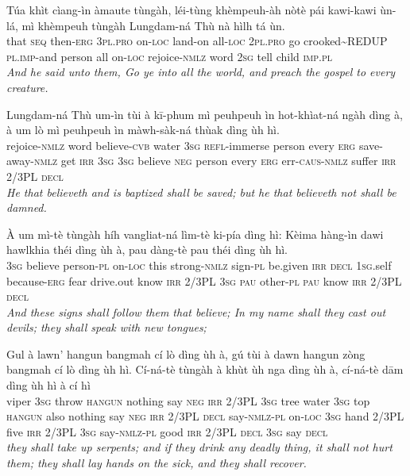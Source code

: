 \documentclass[11pt,a4paper]{article}
\begin{document}
\begin{exe}
\gll Túa khìt cìang-ìn àmaute tùngàh, léi-tùng khèmpeuh-àh nòtè pái kawi-kawi ùn-lá, mì khèmpeuh tùngàh Lungdam-ná Thù nà hìlh tá ùn. \\
     that \textsc{seq} then-\textsc{erg} \textsc{3pl}.\textsc{pro} on-\textsc{loc} land-on all-\textsc{loc} \textsc{2pl}.\textsc{pro} go crooked\textasciitilde{}REDUP \textsc{pl}.\textsc{imp}-and person all on-\textsc{loc} rejoice-\textsc{nmlz} word \textsc{2sg} tell child \textsc{imp}.\textsc{pl} \\
\glt \textcolor{kjvcolor}{\textit{And he said unto them, Go ye into all the world, and preach the gospel to every creature.}}

\gll Lungdam-ná Thù um-ìn tùi à kī-phum mì peuhpeuh ìn hot-khìat-ná ngàh dìng à, à um lò mì peuhpeuh ìn màwh-sàk-ná thùak dìng ùh hì. \\
     rejoice-\textsc{nmlz} word believe-\textsc{cvb} water \textsc{3sg} \textsc{refl}-immerse person every \textsc{erg} save-away-\textsc{nmlz} get \textsc{irr} \textsc{3sg} \textsc{3sg} believe \textsc{neg} person every \textsc{erg} err-\textsc{caus}-\textsc{nmlz} suffer \textsc{irr} 2/3PL \textsc{decl} \\
\glt \textcolor{kjvcolor}{\textit{He that believeth and is baptized shall be saved; but he that believeth not shall be damned.}}

\gll À um mì-tè tùngàh híh vangliat-ná lìm-tè ki-pía dìng hì: Kèima hàng-ìn dawi hawlkhia théi dìng ùh à, pau dàng-tè pau théi dìng ùh hì. \\
     \textsc{3sg} believe person-\textsc{pl} on-\textsc{loc} this strong-\textsc{nmlz} sign-\textsc{pl} be.given \textsc{irr} \textsc{decl} \textsc{1sg}.self because-\textsc{erg} fear drive.out know \textsc{irr} 2/3PL \textsc{3sg} \textsc{pau} other-\textsc{pl} \textsc{pau} know \textsc{irr} 2/3PL \textsc{decl} \\
\glt \textcolor{kjvcolor}{\textit{And these signs shall follow them that believe; In my name shall they cast out devils; they shall speak with new tongues;}}

\gll Gul à lawn' hangun bangmah cí lò dìng ùh à, gú tùi à dawn hangun zòng bangmah cí lò dìng ùh hì. Cí-ná-tè tùngàh à khùt ùh nga dìng ùh à, cí-ná-tè dām dìng ùh hì à cí hì \\
     viper \textsc{3sg} throw \textsc{hangun} nothing say \textsc{neg} \textsc{irr} 2/3PL \textsc{3sg} tree water \textsc{3sg} top \textsc{hangun} also nothing say \textsc{neg} \textsc{irr} 2/3PL \textsc{decl} say-\textsc{nmlz}-\textsc{pl} on-\textsc{loc} \textsc{3sg} hand 2/3PL five \textsc{irr} 2/3PL \textsc{3sg} say-\textsc{nmlz}-\textsc{pl} good \textsc{irr} 2/3PL \textsc{decl} \textsc{3sg} say \textsc{decl} \\
\glt \textcolor{kjvcolor}{\textit{they shall take up serpents; and if they drink any deadly thing, it shall not hurt them; they shall lay hands on the sick, and they shall recover.}}


\end{exe}
\end{document}
